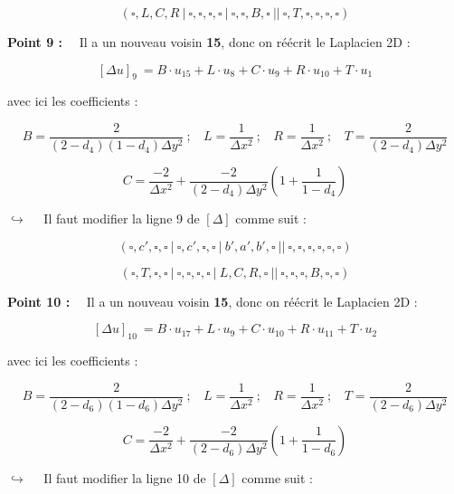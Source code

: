\documentclass[12pt]{article}
\begin{document}
$$(\square,L,C,R~|~\square,\square,\square,\square~|~\square,\square,B,\square~||~\square,T,\square,\square,\square,\square)$$

\vspace{5 mm}

\noindent
\textbf{Point 9 :}~~ Il a un nouveau voisin \textbf{15}, donc on réécrit le Laplacien 2D :

$$[\Delta u]_{9}~ = B \cdot u_{15} + L \cdot u_{8} + C \cdot u_{9} + R \cdot u_{10} + T \cdot u_{1}$$

\vspace{5 mm}
\noindent
avec ici les coefficients :

$$B = \frac{2}{(2-d_4)(1-d_4) \Delta y^2}~;~~~~ L = \frac{1}{\Delta x^2}~;~~~~ R = \frac{1}{\Delta x^2}~;~~~~ T = \frac{2}{(2-d_4) \Delta y^2}$$

$$C = \frac{-2}{\Delta x^2} + \frac{-2}{(2-d_4)\Delta y^2} \left( 1 + \frac{1}{1-d_4} \right)$$

\vspace{5 mm}

\newpage

$\hookrightarrow$~~ Il faut modifier la ligne 9 de $[\Delta]$ comme suit :

$$(\square,c',\square,\square~|~\square,c',\square,\square~|~b',a',b',\square~||~\square,\square,\square,\square,\square,\square)$$

$$(\square,T,\square,\square~|~\square,\square,\square,\square~|~L,C,R,\square~||~\square,\square,\square,B,\square,\square)$$

\vspace{5 mm}

\noindent
\textbf{Point 10 :}~~ Il a un nouveau voisin \textbf{15}, donc on réécrit le Laplacien 2D :

$$[\Delta u]_{10}~ = B \cdot u_{17} + L \cdot u_{9} + C \cdot u_{10} + R \cdot u_{11} + T \cdot u_{2}$$

\vspace{5 mm}
\noindent
avec ici les coefficients :

$$B = \frac{2}{(2-d_6)(1-d_6) \Delta y^2}~;~~~~ L = \frac{1}{\Delta x^2}~;~~~~ R = \frac{1}{\Delta x^2}~;~~~~ T = \frac{2}{(2-d_6) \Delta y^2}$$

$$C = \frac{-2}{\Delta x^2} + \frac{-2}{(2-d_6)\Delta y^2} \left( 1 + \frac{1}{1-d_6} \right)$$

\vspace{5 mm}

$\hookrightarrow$~~ Il faut modifier la ligne 10 de $[\Delta]$ comme suit :
\end{document}
